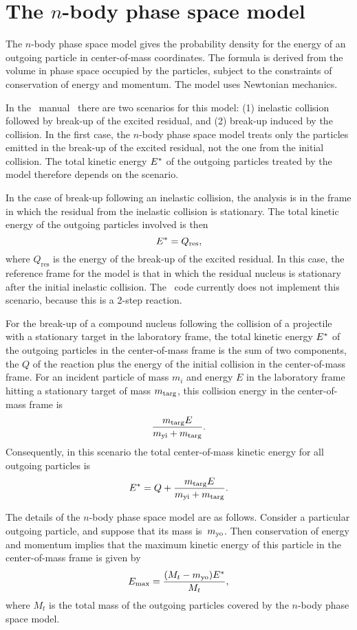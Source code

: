 \section{The $n$-body phase space model}
The $n$-body phase space model gives the probability density for
the energy of an outgoing particle in center-of-mass coordinates.
The formula is derived from the volume in phase space occupied
by the particles, subject to the constraints of conservation
of energy and momentum.  The model uses Newtonian mechanics.

In the \ENDF\ manual~\cite{ENDFB}
there are two scenarios for this model: (1) inelastic collision
followed by break-up of the excited residual, and (2) break-up
induced by the collision.  In the first case, the $n$-body phase space
model treats only the particles emitted in the break-up of the excited
residual, not the one from the initial collision.  The total kinetic energy ${E^*}$
of the outgoing particles treated by the model therefore depends on
the scenario.

In the case of break-up following an
inelastic collision, the analysis is in the frame in which the residual from
the inelastic collision is stationary.  The total kinetic energy of the 
outgoing particles involved is then
$$
  {E^*} = Q_{\textrm{res}},
$$
where $Q_{\textrm{res}}$ is
the energy of the break-up of the excited residual.  In this case, the reference
frame for the model is that in which the residual nucleus is stationary
after the initial inelastic collision.  The \gettransfer\ 
code currently does not implement this scenario, because this is
a 2-step reaction.

For the break-up of a compound nucleus following the collision of a projectile
with a stationary target in the laboratory frame, the total kinetic energy ${E^*}$
of the outgoing particles in the center-of-mass frame is the sum of two
components, the $Q$ of the reaction plus the energy of the initial collision in the
center-of-mass frame.  For an incident
particle of mass $m_i$ and energy $E$ in the laboratory frame hitting a
stationary target of mass $m_{\text{targ}}$, this collision energy in the center-of-mass frame is
$$
  \frac{m_{\text{targ}} E}{m_{\text{yi}} + m_{\text{targ}}}.
$$
Consequently, in this scenario the total center-of-mass kinetic energy for all
outgoing particles is
\begin{equation}
  {E^*} = Q + \frac{m_{\text{targ}} E}{m_{\text{yi}} + m_{\text{targ}}}.
  \label{def-Estar}
\end{equation}

The details of the $n$-body phase space model are as follows.
Consider a particular outgoing particle, and suppose that its mass is~$m_{\text{yo}}$.
Then conservation of energy and
momentum implies that the maximum kinetic energy of this particle
in the center-of-mass frame is given by
\begin{equation}
  E_{\text{max}} = \frac{(M_t - m_{\text{yo}}) {E^*}}{M_t},
  \label{def-Emax}
\end{equation}
where $M_t$ is the total mass of the outgoing particles covered by
the $n$-body phase space model.

